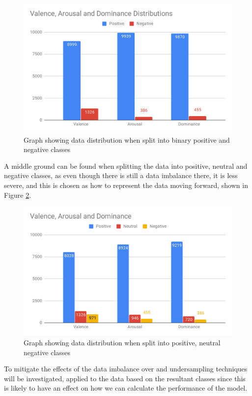 \begin{figure}[ht]
\centering
\includegraphics[scale=0.25]{graphs/binaryDist.png}
\caption{Graph showing data distribution when split into binary positive and negative classes}
\label{dist:bin}
\end{figure}

A middle ground can be found when splitting the data into positive, neutral and negative classes, as even though there is still a data imbalance there, it is less severe, and this is chosen as how to represent the data moving forward, shown in Figure \ref{dist:tri}.

\begin{figure}[H]
\centering
\includegraphics[scale=0.3]{graphs/nonBinaryDist.png}
\caption{Graph showing data distribution when split into positive, neutral negative classes}
\label{dist:tri}
\end{figure}

To mitigate the effects of the data imbalance over and undersampling techniques will be investigated, applied to the data based on the resultant classes since this is likely to have an effect on how we can calculate the performance of the model.

